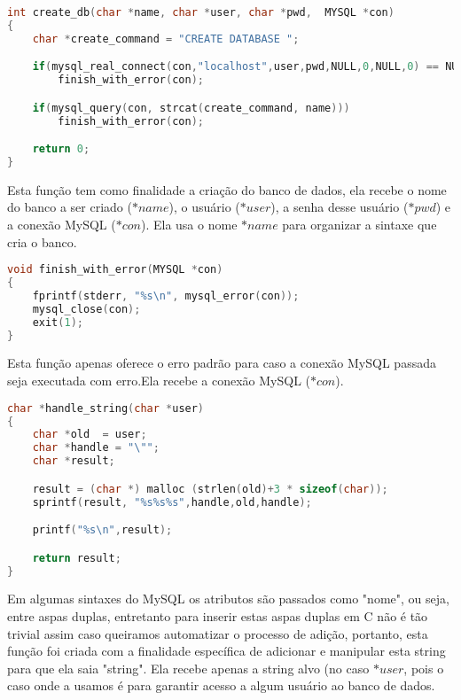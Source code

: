 \begin{lstlisting}[language=c, caption={fun\c{c}\~{a}o $create\_db()$}, label={lst:dbphi5}]
int create_db(char *name, char *user, char *pwd,  MYSQL *con)
{
	char *create_command = "CREATE DATABASE ";

	if(mysql_real_connect(con,"localhost",user,pwd,NULL,0,NULL,0) == NULL)
		finish_with_error(con);

	if(mysql_query(con, strcat(create_command, name)))
		finish_with_error(con);

	return 0;
}
\end{lstlisting}

Esta fun\c{c}\~{a}o tem como finalidade a cria\c{c}\~{a}o do banco de dados, ela
recebe o nome do banco a ser criado (\textit{$*name$}), o usu\'{a}rio
(\textit{$*user$}), a senha desse usu\'{a}rio (\textit{$*pwd$}) e a conex\~{a}o
MySQL (\textit{$*con$}). Ela usa o nome \textit{$*name$} para organizar a
sintaxe que cria o banco.

\begin{lstlisting}[language=c, caption={fun\c{c}\~{a}o $finish\_with\_error()$}, label={lst:dbphi6}]
void finish_with_error(MYSQL *con)
{
	fprintf(stderr, "%s\n", mysql_error(con));
	mysql_close(con);
	exit(1);
}
\end{lstlisting}

Esta fun\c{c}\~{a}o apenas oferece o erro padr\~{a}o para caso a conex\~{a}o
MySQL passada seja executada com erro.Ela recebe a conex\~{a}o MySQL
(\textit{$*con$}).

\begin{lstlisting}[language=c, caption={fun\c{c}\~{a}o $handle\_string()$}, label={lst:dbphi7}]
char *handle_string(char *user)
{
	char *old  = user;
	char *handle = "\"";
	char *result;

	result = (char *) malloc (strlen(old)+3 * sizeof(char));
	sprintf(result, "%s%s%s",handle,old,handle);

	printf("%s\n",result);

	return result;
}
\end{lstlisting}

Em algumas sintaxes do MySQL os atributos s\~{a}o passados como "nome", ou seja,
entre aspas duplas, entretanto para inserir estas aspas duplas em C n\~{a}o
\'{e} t\~{a}o trivial assim caso queiramos automatizar o processo de
adi\c{c}\~{a}o, portanto, esta fun\c{c}\~{a}o foi criada com a finalidade
espec\'{i}fica de adicionar e manipular esta string para que ela saia "string".
Ela recebe apenas a string alvo (no caso \textit{$*user$}, pois o caso onde a
usamos \'{e} para garantir acesso a algum usu\'{a}rio ao banco de dados.

